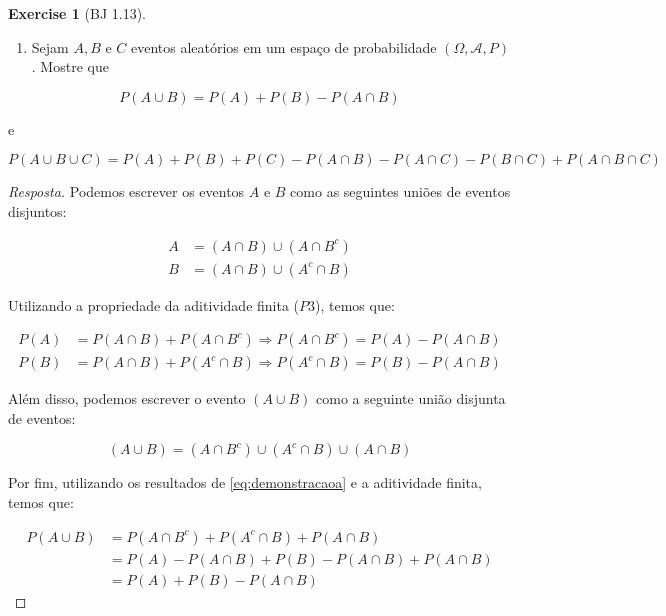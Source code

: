 \documentclass[
]{article}
\providecommand{\tightlist}{%
  \setlength{\itemsep}{0pt}\setlength{\parskip}{0pt}}
\theoremstyle{definition}
\theoremstyle{definition}
\theoremstyle{definition}
\newtheorem{exercise}{Exercise}[section]
\theoremstyle{definition}
\theoremstyle{remark}
\begin{document}
\begin{exercise}[BJ 1.13]
\protect\hypertarget{exr:exbj13}{}\label{exr:exbj13}\leavevmode

\begin{enumerate}
\def\labelenumi{\alph{enumi})}
\tightlist
\item
  Sejam \(A, B \text{ e } C\) eventos aleatórios em um espaço de probabilidade \((\Omega,\mathcal{A},P)\). Mostre que
\end{enumerate}

\begin{equation*}
P(A \cup B) = P(A) + P(B) - P(A \cap B)
\end{equation*}

e

\begin{equation*}
P(A \cup B \cup C) = P(A) + P(B) + P(C) - P(A \cap B) - P(A \cap C) - P(B \cap C) + P(A \cap B \cap C)
\end{equation*}

\begin{proof}[Resposta]
Podemos escrever os eventos \(A\) e \(B\) como as seguintes uniões de eventos disjuntos:

\begin{align*}
A &= (A \cap B) \cup (A \cap B^{c}) \\
B &= (A \cap B) \cup (A^{c} \cap B)
\end{align*}

Utilizando a propriedade da aditividade finita (\(P3\)), temos que:

\begin{equation}
\begin{split}
P(A) &= P(A \cap B) + P(A \cap B^{c}) \Rightarrow P(A \cap B^{c}) = P(A) - P(A \cap B) \\
P(B) &= P(A \cap B) + P(A^{c} \cap B) \Rightarrow P(A^{c} \cap B) = P(B) - P(A \cap B)
\end{split}
\label{eq:demonstracaoa}
\end{equation}

Além disso, podemos escrever o evento \((A \cup B)\) como a seguinte união disjunta de eventos:

\begin{equation*}
(A \cup B) = (A \cap B^{c}) \cup (A^{c} \cap B) \cup (A \cap B)
\end{equation*}

Por fim, utilizando os resultados de \eqref{eq:demonstracaoa} e a aditividade finita, temos que:

\begin{align*}
P(A \cup B) &= P(A \cap B^{c}) + P(A^{c} \cap B) + P(A \cap B) \\
&= P(A) - P(A \cap B) + P(B) - P(A \cap B) + P(A \cap B) \\
&= P(A) + P(B) - P(A \cap B)
\end{align*}


\end{proof}
\end{exercise}
\end{document}
